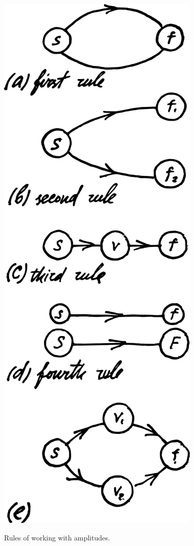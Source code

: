 \documentclass[a4paper,sfsidenotes,colorlinks=true]{tufte-book}
\numberwithin{equation}{section}
\numberwithin{figure}{section}
\begin{document}
\begin{marginfigure}[2cm]
\centering
\includegraphics[width=\textwidth]{figures/fig-08-01.pdf}
\caption{Rules of working with amplitudes.}
\label{fig-8.1}
\end{marginfigure}
\end{document}

